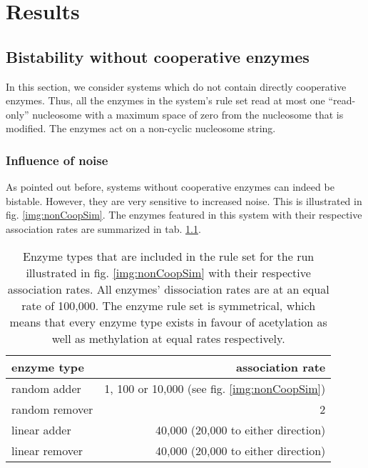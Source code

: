\chapter{Results}
    \label{cha:results}

    \section{Bistability without cooperative enzymes}
        \label{sec:ResNon-cooperative}

        In this section, we consider systems which do not contain directly cooperative enzymes. Thus, all the enzymes in the system's rule set read at most one “read-only” nucleosome with a maximum space of zero from the nucleosome that is modified. The enzymes act on a non-cyclic nucleosome string.

        \subsection{Influence of noise}
            As pointed out before, systems without cooperative enzymes can indeed be bistable. However, they are very sensitive to increased noise. This is illustrated in fig. \ref{img:nonCoopSim}. The enzymes featured in this system with their respective association rates are summarized in tab. \ref{img:enzymeRatesNoise}.

            \begin{table}[htbp!]
                \caption{Enzyme types that are included in the rule set for the run illustrated in fig. \ref{img:nonCoopSim} with their respective association rates. All enzymes' dissociation rates are at an equal rate of 100,000. The enzyme rule set is symmetrical, which means that every enzyme type exists in favour of acetylation as well as methylation at equal rates respectively.}
                \begin{center}
                    \begin{tabular}{l r}
                        \hline
                        \textbf{enzyme type} & \textbf{association rate} \\
                        \hline
                        random adder & 1, 100 or 10,000 (see fig. \ref{img:nonCoopSim})\\
                        random remover & 2 \\
                        linear adder & 40,000 (20,000 to either direction)\\
                        linear remover & 40,000 (20,000 to either direction)\\
                        \hline
                    \end{tabular}
                \end{center}
                \label{img:enzymeRatesNoise}
            \end{table}

